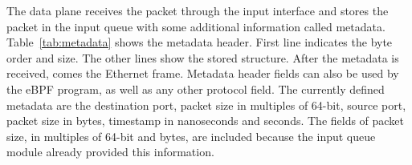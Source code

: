 

The data plane receives the packet through the input interface and stores the packet in the input queue with some additional information called metadata.
Table~\ref{tab:metadata} shows the metadata header. First line indicates the byte order and size. The other lines show the stored structure.
After the metadata is received, comes the Ethernet frame. Metadata header fields can also be used by the eBPF program, as well as any other protocol field. The currently defined metadata are the destination port, packet size in multiples of 64-bit, source port, packet size in bytes, timestamp in nanoseconds and seconds. The fields of packet size, in multiples of 64-bit and bytes, are included because the input queue module already provided this information.


